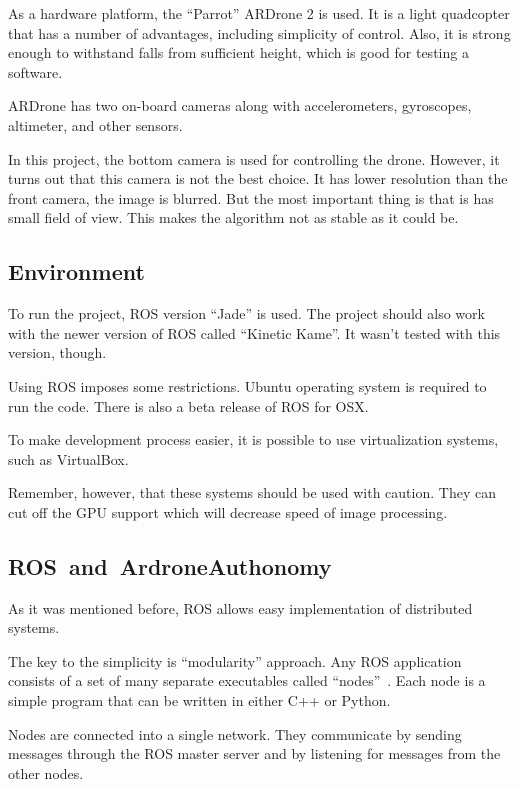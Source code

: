 \documentclass[12pt]{article}
\begin{document}
    As a hardware platform, the ``Parrot'' ARDrone 2 is used.
    It is a light quadcopter that has a number of advantages,
    including simplicity of control. Also, it is strong enough to
    withstand falls from sufficient height, which is good for testing
    a software.

    ARDrone has two on-board cameras along with accelerometers, gyroscopes,
    altimeter, and other sensors.

    In this project, the bottom camera is used for controlling the drone.
    However, it turns out that this camera is not the best choice.
    It has lower resolution than the front camera, the image is blurred.
    But the most important thing is that is has small field of view.
    This makes the algorithm not as stable as it could be.

    \subsection{Environment}

    To run the project, ROS version ``Jade'' is used. The project should also work with
    the newer version of ROS called ``Kinetic Kame''. It wasn't
    tested with this version, though.

    Using ROS imposes some restrictions.
    Ubuntu operating system is required to run the code.
    There is also a beta release of ROS for OSX.

    To make development process easier, it is
    possible to use virtualization systems, such as VirtualBox.

    Remember, however, that these systems should be used with caution.
    They can cut off the GPU support which will decrease speed of
    image processing.

    \subsection{ROS~and~ArdroneAuthonomy}

    As it was mentioned before, ROS allows easy implementation
    of distributed systems.

    The key to the simplicity is ``modularity'' approach.
    Any ROS application consists of a set of many separate executables
    called ``nodes''~\cite{ROSsite}. Each node is a simple program
    that can be written in either C++ or Python.

    Nodes are connected into a single network.
    They communicate by sending messages
    through the ROS master server and by listening for messages
    from the other nodes.
\end{document}
